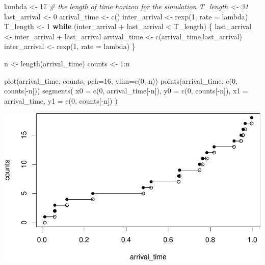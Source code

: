 \documentclass[landscape, 20pt]{extreport}
\newenvironment{Shaded}{\begin{snugshade}}{\end{snugshade}}
\newcommand{\AttributeTok}[1]{\textcolor[rgb]{0.77,0.63,0.00}{#1}}
\newcommand{\CommentTok}[1]{\textcolor[rgb]{0.56,0.35,0.01}{\textit{#1}}}
\newcommand{\ControlFlowTok}[1]{\textcolor[rgb]{0.13,0.29,0.53}{\textbf{#1}}}
\newcommand{\DecValTok}[1]{\textcolor[rgb]{0.00,0.00,0.81}{#1}}
\newcommand{\FunctionTok}[1]{\textcolor[rgb]{0.00,0.00,0.00}{#1}}
\newcommand{\NormalTok}[1]{#1}
\newcommand{\OtherTok}[1]{\textcolor[rgb]{0.56,0.35,0.01}{#1}}
\newcommand{\SpecialCharTok}[1]{\textcolor[rgb]{0.00,0.00,0.00}{#1}}
\theoremstyle{definition}
\theoremstyle{definition}
\theoremstyle{definition}
\theoremstyle{definition}
\theoremstyle{remark}
\begin{document}
\begin{Shaded}
\begin{Highlighting}[]
\NormalTok{lambda }\OtherTok{\textless{}{-}} \DecValTok{17}
\CommentTok{\# the length of time horizon for the simulation T\_length \textless{}{-} 31}
\NormalTok{last\_arrival }\OtherTok{\textless{}{-}} \DecValTok{0}
\NormalTok{arrival\_time }\OtherTok{\textless{}{-}} \FunctionTok{c}\NormalTok{()}
\NormalTok{inter\_arrival }\OtherTok{\textless{}{-}} \FunctionTok{rexp}\NormalTok{(}\DecValTok{1}\NormalTok{, }\AttributeTok{rate =}\NormalTok{ lambda)}
\NormalTok{T\_length }\OtherTok{\textless{}{-}} \DecValTok{1}
\ControlFlowTok{while}\NormalTok{ (inter\_arrival }\SpecialCharTok{+}\NormalTok{ last\_arrival }\SpecialCharTok{\textless{}}\NormalTok{ T\_length) \{ }
\NormalTok{  last\_arrival }\OtherTok{\textless{}{-}}\NormalTok{ inter\_arrival }\SpecialCharTok{+}\NormalTok{ last\_arrival }
\NormalTok{  arrival\_time }\OtherTok{\textless{}{-}} \FunctionTok{c}\NormalTok{(arrival\_time,last\_arrival) }
\NormalTok{  inter\_arrival }\OtherTok{\textless{}{-}} \FunctionTok{rexp}\NormalTok{(}\DecValTok{1}\NormalTok{, }\AttributeTok{rate =}\NormalTok{ lambda)}
\NormalTok{\}}


\NormalTok{n }\OtherTok{\textless{}{-}} \FunctionTok{length}\NormalTok{(arrival\_time)}
\NormalTok{counts }\OtherTok{\textless{}{-}} \DecValTok{1}\SpecialCharTok{:}\NormalTok{n}

\FunctionTok{plot}\NormalTok{(arrival\_time, counts, }\AttributeTok{pch=}\DecValTok{16}\NormalTok{, }\AttributeTok{ylim=}\FunctionTok{c}\NormalTok{(}\DecValTok{0}\NormalTok{, n))}
\FunctionTok{points}\NormalTok{(arrival\_time, }\FunctionTok{c}\NormalTok{(}\DecValTok{0}\NormalTok{, counts[}\SpecialCharTok{{-}}\NormalTok{n]))}
\FunctionTok{segments}\NormalTok{(}
  \AttributeTok{x0 =} \FunctionTok{c}\NormalTok{(}\DecValTok{0}\NormalTok{, arrival\_time[}\SpecialCharTok{{-}}\NormalTok{n]),}
  \AttributeTok{y0 =} \FunctionTok{c}\NormalTok{(}\DecValTok{0}\NormalTok{, counts[}\SpecialCharTok{{-}}\NormalTok{n]),}
  \AttributeTok{x1 =}\NormalTok{ arrival\_time,}
  \AttributeTok{y1 =} \FunctionTok{c}\NormalTok{(}\DecValTok{0}\NormalTok{, counts[}\SpecialCharTok{{-}}\NormalTok{n])}
\NormalTok{)}
\end{Highlighting}
\end{Shaded}

\includegraphics{PlotPoissonProcess-1.pdf}
\end{document}
